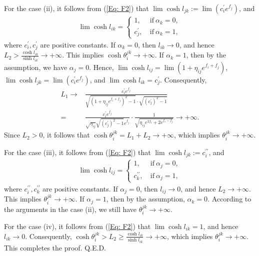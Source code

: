\documentclass[12pt]{amsart}
\theoremstyle{definition}
\def\qed{\hfill{Q.E.D.}\smallskip}
\begin{document}
For the case (ii), it follows from (\ref{Eq: F2}) that  $\lim\cosh l_{jk}:=\lim(c^\prime_ie^{f_j})$,
and
\begin{eqnarray*}
\lim\cosh l_{ik}=
\begin{cases}
1,\ & \text{if}\ \alpha_k=0,  \\
c^\prime_j,\ & \text{if}\ \alpha_k=1,
\end{cases}
\end{eqnarray*}
where $c^\prime_i,c^\prime_j$ are positive constants.
If $\alpha_k=0$, then $l_{ik}\rightarrow 0$, and hence $L_2>\frac{\cosh l_{ik}}{\sinh l_{ik}}\rightarrow +\infty$.
This implies $\cosh\theta^{jk}_i\rightarrow +\infty$.
If $\alpha_k=1$, then by the assumption, we have $\alpha_j=0$.
Hence, $\lim\cosh l_{ij}=\lim(1+\eta_{ij}e^{f_i+f_j})$,
$\lim\cosh l_{jk}=\lim(c^\prime_ie^{f_j})$, and
$\lim\cosh l_{ik}=c^\prime_j$.
Consequently, 
\begin{equation*}
\begin{aligned}
L_1\rightarrow &\frac{c^\prime_ie^{f_j}}
{\sqrt{(1+\eta_{ij}e^{f_i+f_j})^2-1}\cdot
\sqrt{(c^\prime_j)^2-1}}\\
=&\frac{c^\prime_ie^{f_j}}
{\sqrt{\eta_{ij}}\sqrt{(c^\prime_j)^2-1}e^{f_j}}\cdot
\frac{1}{\sqrt{\eta_{ij}e^{2f_i}+2e^{f_i-f_j}}}
\rightarrow+\infty.
\end{aligned}
\end{equation*}
Since $L_2>0$, it follows that $\cosh \theta^{jk}_i=L_1+L_2\rightarrow +\infty$, 
which implies $\theta^{jk}_i\rightarrow +\infty$.

For the case (iii), it follows from (\ref{Eq: F2}) that $\lim\cosh l_{jk}:=c^{\prime\prime}_i$, and
\begin{eqnarray*}
\lim\cosh l_{ij}=
\begin{cases}
1,\ & \text{if}\ \alpha_j=0,  \\
c^{\prime\prime}_k,\ & \text{if}\ \alpha_j=1,
\end{cases}
\end{eqnarray*}
where $c^{\prime\prime}_i,c^{\prime\prime}_k$ are positive constants.
If $\alpha_j=0$, then $l_{ij}\rightarrow 0$, and hence $L_2\rightarrow +\infty$.
This implies $\theta^{jk}_i\rightarrow +\infty$.
If $\alpha_j=1$, then by the assumption, $\alpha_k=0$.
According to the arguments in the case (ii),
we still have $\theta^{jk}_i\rightarrow +\infty$.

For the case (iv), it follows from (\ref{Eq: F2}) that $\lim\cosh l_{ik}=1$, and hence $l_{ik}\rightarrow 0$.
Consequently, $\cosh\theta^{jk}_i>L_2\geq\frac{\cosh l_{ik}}{\sinh l_{ik}}\rightarrow +\infty$, which implies $\theta^{jk}_i\rightarrow +\infty$.
This completes the proof.
\qed
\end{document}
